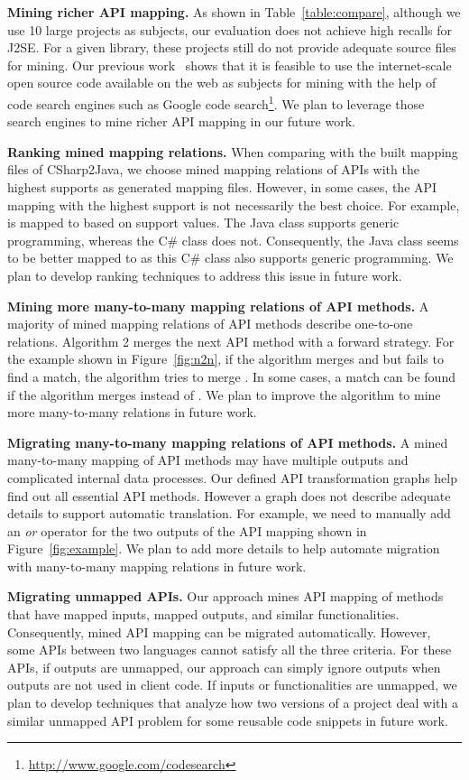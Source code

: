 \textbf{Mining richer API mapping.} As shown in
Table~\ref{table:compare}, although we use 10 large projects as
subjects, our evaluation does not achieve high recalls for J2SE. For
a given library, these projects still do not provide adequate source
files for mining. Our previous
work~\cite{thummalapenta07parseweb,thummalapentaase08spotweb} shows
that it is feasible to use the internet-scale open source code
available on the web as subjects for mining with the help of code
search engines such as Google code
search\footnote{\url{http://www.google.com/codesearch}}. We plan to
leverage those search engines to mine richer API mapping in our
future work.

\textbf{Ranking mined mapping relations.} When comparing with the
built mapping files of CSharp2Java, we choose mined mapping
relations of APIs with the highest supports as generated mapping
files. However, in some cases, the API mapping with the highest
support is not necessarily the best choice. For example,
 is mapped to
 based on support values. The
Java class supports generic programming, whereas the C\# class does
not. Consequently, the Java class seems to be better mapped to
 as this C\# class also
supports generic programming. We plan to develop ranking techniques
to address this issue in future work.

\textbf{Mining more many-to-many mapping relations of API methods.}
A majority of mined mapping relations of API methods describe
one-to-one relations. Algorithm 2 merges the next API method with a
forward strategy. For the example shown in Figure~\ref{fig:n2n}, if
the algorithm merges  and  but
fails to find a match, the algorithm tries to merge
. In some cases, a match can be found if the
algorithm merges  instead of .
We plan to improve the algorithm to mine more many-to-many relations
in future work.

\textbf{Migrating many-to-many mapping relations of API methods.} A
mined many-to-many mapping of API methods may have multiple outputs
and complicated internal data processes. Our defined API
transformation graphs help find out all essential API methods.
However a graph does not describe adequate details to support
automatic translation. For example, we need to manually add an
\emph{or} operator for the two outputs of the API mapping shown in
Figure~\ref{fig:example}. We plan to add more details to help
automate migration with many-to-many mapping relations in future
work.

\textbf{Migrating unmapped APIs.} Our approach mines API mapping of
methods that have mapped inputs, mapped outputs, and similar
functionalities. Consequently, mined API mapping can be migrated
automatically. However, some APIs between two languages cannot
satisfy all the three criteria. For these APIs, if outputs are
unmapped, our approach can simply ignore outputs when outputs are
not used in client code. If inputs or functionalities are unmapped,
we plan to develop techniques that analyze how two versions of a
project deal with a similar unmapped API problem for some reusable
code snippets in future work.

